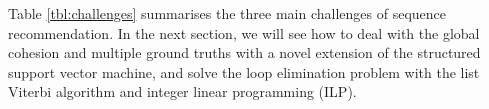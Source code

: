 Table \ref{tbl:challenges} summarises the three main challenges of sequence recommendation.
In the next section, we will see how to deal with the global cohesion and multiple ground truths with a novel extension of
the structured support vector machine,
and solve the loop elimination problem with the list Viterbi algorithm and integer linear programming (ILP).
